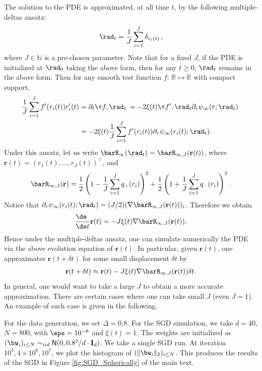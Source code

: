 \documentclass[11pt]{article}
\begin{document}
The solution to the PDE is approximated, at all time $t$, by the following multiple-deltas ansatz:
\begin{align}
\rad_t = \frac{1}{J}\sum_{i=1}^J\delta_{r_i(t)}\, ,
\end{align}
where $J\in\mathbb{N}$ is a pre-chosen parameter. Note that for a fixed $J$, if the PDE is initialized at $\rad_0$ taking the above form, then for any $t\geq 0$, $\rad_t$ remains in the above form. Then for any smooth test function $f:\,\mathbb{R}\mapsto\mathbb{R}$ with compact support,
\begin{align}
\frac{1}{J}\sum_{i=1}^J f'(r_i(t))r_i'(t) &= \partial_t\<f, \rad_t\> =  -2\xi(t) \<f', \rad_t \partial_r \psi_\infty(r; \rad_t) \> \\
&=  -2\xi(t) \frac{1}{J}\sum_{i=1}^J f'(r_i(t))\partial_r \psi_\infty(r_i(t); \rad_t).
\end{align}
Under this ansatz, let us write $\barR_\infty(\rad_t) = \barR_{\infty,J}(\mathbf{r}(t))$, where $\mathbf{r}(t)=(r_1(t),...,r_J(t))^\top$, and
\begin{align}
\barR_{\infty,J}(\mathbf{r}) = \frac{1}{2}\left(1-\frac{1}{J} \sum_{i=1}^J q_+(r_i)\right)^2+\frac{1}{2}\left(1+\frac{1}{J} \sum_{i=1}^J q_-(r_i)\right)^2.
\end{align}
Notice that $\partial_r \psi_\infty(r_i(t); \rad_t) =(J/2) (\nabla \barR_{\infty,J}(\mathbf{r}(t)))_i$. Therefore we obtain
\begin{align}
\frac{\de\phantom{t}}{\de t}\mathbf{r}(t) = -J\xi(t)\nabla \barR_{\infty,J}(\mathbf{r}(t)).
\end{align}
Hence under the multiple-deltas ansatz, one can simulate numerically the PDE via the above evolution equation of $\mathbf{r}(t)$. In particular, given $\mathbf{r}(t)$,  one approximates $\mathbf{r}(t+\delta t)$ for some small displacement $\delta t$ by
\begin{align}
\mathbf{r}(t+\delta t) \approx \mathbf{r}(t) -J\xi(t)\nabla \barR_{\infty,J}(\mathbf{r}(t))\delta t.\label{eq:num_PDE_iso_discretize}
\end{align}
In general, one would want to take a large $J$ to obtain a more accurate approximation. There are certain cases where one can take small $J$ (even $J=1$). An example of such case is given in the following.

 For the data generation, we set $\Delta=0.8$. For the SGD simulation, we take $d=40$, $N=800$, with $\eps=10^{-6}$ and $\xi(t) = 1$. The weights are initialized as $(\bw_{i})_{i\leq N}\sim_{iid}\mathsf{N}(0,0.8^2/d\cdot \mathbf{I}_d)$. We take a single SGD run. At iteration $10^3, 4\times 10^6, 10^7$, we plot the histogram of $(\Vert\bw_i\Vert_2)_{i\leq N}$. This produces the results of the SGD in Figure \ref{fig:SGD_Spherically} of the main text.
\end{document}
